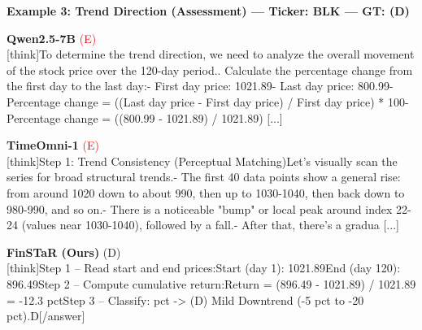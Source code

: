\noindent
\textbf{Example 3: Trend Direction (Assessment) --- Ticker: BLK --- GT: (D)}
\vspace{2pt}

\noindent
\begin{minipage}[t]{0.28\textwidth}
\colorbox{red!8}{\parbox{\dimexpr\textwidth-2\fboxsep}{
\textbf{Qwen2.5-7B} \textcolor{red}{(E)} \\[2pt]
\tiny
[think]\newline To determine the trend direction, we need to analyze the overall movement of the stock price over the 120-day period.. Calculate the percentage change from the first day to the last day:\newline    - First day price: 1021.89\newline    - Last day price: 800.99\newline    - Percentage change = ((Last day price - First day price) / First day price) * 100\newline    - Percentage change = ((800.99 - 1021.89) / 1021.89) [...]
}}
\end{minipage}
\hfill
\begin{minipage}[t]{0.28\textwidth}
\colorbox{red!8}{\parbox{\dimexpr\textwidth-2\fboxsep}{
\textbf{TimeOmni-1} \textcolor{red}{(E)} \\[2pt]
\tiny
[think]\newline Step 1: Trend Consistency (Perceptual Matching)\newline Let's visually scan the series for broad structural trends.\newline - The first  40 data points show a general rise: from around 1020 down to about 990, then up to 1030-1040, then back down to 980-990, and so on.\newline - There is a noticeable "bump" or local peak around index 22-24 (values near 1030-1040), followed by a fall.\newline - After that, there's a gradua [...]
}}
\end{minipage}
\hfill
\begin{minipage}[t]{0.41\textwidth}
\colorbox{green!10}{\parbox{\dimexpr\textwidth-2\fboxsep}{
\textbf{FinSTaR (Ours)} \textcolor{green!50!black}{(D)} \\[2pt]
\tiny
[think]\newline Step 1 -- Read start and end prices:\newline Start (day 1): 1021.89\newline End (day 120): 896.49\newline Step 2 -- Compute cumulative return:\newline Return = (896.49 - 1021.89) / 1021.89 = -12.3 pct\newline Step 3 -- Classify: pct -> (D) Mild Downtrend (-5 pct to -20 pct).\newline [/think]\newline [answer]D[/answer]
}}
\vspace{-30pt}
\end{minipage}

